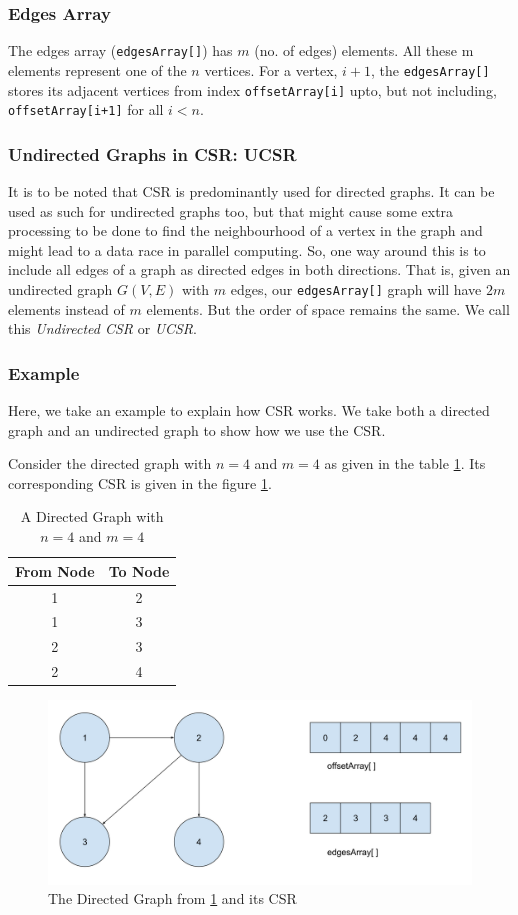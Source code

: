 \documentclass[MTech]{iitmdiss}
\begin{document}
\subsubsection{Edges Array}
The edges array (\verb+edgesArray[]+) has $m$ (no. of edges) elements. All these m elements represent one of the $n$ vertices. For a vertex, $i+1$, the \verb+edgesArray[]+ stores its adjacent vertices from index \verb+offsetArray[i]+ upto, but not including, \verb|offsetArray[i+1]| for all $i<n$.
\subsubsection{Undirected Graphs in CSR: UCSR}
It is to be noted that CSR is predominantly used for directed graphs. It can be used as such for undirected graphs too, but that might cause some extra processing to be done to find the neighbourhood of a vertex in the graph and might lead to a data race in parallel computing. So, one way around this is to include all edges of a graph as directed edges in both directions. That is, given an undirected graph $G(V,E)$ with $m$ edges, our \verb+edgesArray[]+ graph will have $2m$ elements instead of $m$ elements. But the order of space remains the same. We call this \textit{Undirected CSR} or \textit{UCSR}.
\subsubsection{Example}
Here, we take an example to explain how CSR works. We take both a directed graph and an undirected graph to show how we use the CSR.

Consider the directed graph with $n=4$ and $m=4$ as given in the table \ref{table:1}. Its corresponding CSR is given in the figure \ref{fig:csrd}.
\begin{table}[h!]
\centering
\begin{tabular}{||c|c||} 
 \hline
 From Node & To Node \\ [0.5ex] 
 \hline\hline
1 & 2\\
\hline
1 & 3\\
\hline
2 & 3\\
\hline
2 & 4\\
 \hline
\end{tabular}
\caption{A Directed Graph with $n=4$ and $m=4$}
\label{table:1}
\end{table}

\begin{figure}[h]
    \centering
    \includegraphics[width=\textwidth,scale=0.6,keepaspectratio=true]{csrdirected.jpg}
    \caption{
       The Directed Graph from \ref{table:1} and its CSR
    }
    \label{fig:csrd}
\end{figure}
\end{document}
